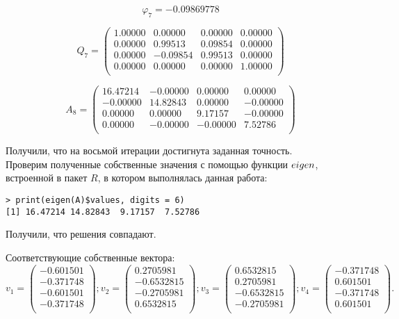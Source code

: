 \documentclass[14pt,a4paper]{scrartcl}
\begin{document}
$$\varphi_7 = -0.09869778 $$

$$ Q_7 =
\begin{pmatrix}
1.00000 & 0.00000 & 0.00000 & 0.00000 \\ 
0.00000 & 0.99513 & 0.09854 & 0.00000 \\ 
0.00000 & -0.09854 & 0.99513 & 0.00000 \\ 
0.00000 & 0.00000 & 0.00000 & 1.00000 \\ 
\end{pmatrix}
$$

$$
A_8 = 
\begin{pmatrix}
16.47214 & -0.00000 & 0.00000 & 0.00000 \\ 
-0.00000 & 14.82843 & 0.00000 & -0.00000 \\ 
0.00000 & 0.00000 & 9.17157 & -0.00000 \\ 
0.00000 & -0.00000 & -0.00000 & 7.52786 \\ 
\end{pmatrix}
$$

Получили, что на восьмой итерации достигнута заданная точность.\\
Проверим полученные собственные значения с помощью функции $\boldmath{eigen}$, встроенной в пакет $R$, в котором выполнялась данная работа:
\begin{verbatim}
> print(eigen(A)$values, digits = 6)
[1] 16.47214 14.82843  9.17157  7.52786
\end{verbatim}

Получили, что решения совпадают.

Соответствующие собственные вектора:
$$
v_1 = 
\begin{pmatrix}
	-0.601501\\ -0.371748\\ -0.601501\\ -0.371748\\
\end{pmatrix};
v_2 = 
\begin{pmatrix}
	0.2705981\\ -0.6532815\\ -0.2705981\\  0.6532815\\
\end{pmatrix};
v_3 = 
\begin{pmatrix}
	 0.6532815\\  0.2705981\\ -0.6532815\\ -0.2705981\\
\end{pmatrix};
v_4 = 
\begin{pmatrix}
	-0.371748\\  0.601501\\ -0.371748\\  0.601501\\
\end{pmatrix}.
$$
\end{document}

